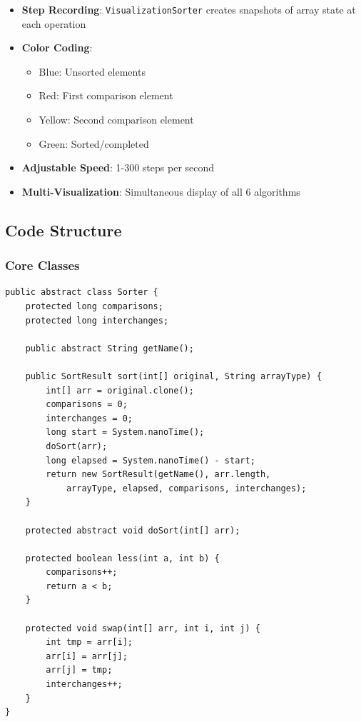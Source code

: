 \documentclass[12pt,a4paper]{article}
\begin{document}
\begin{itemize}
    \item \textbf{Step Recording}: \texttt{VisualizationSorter} creates snapshots of array state at each operation
    \item \textbf{Color Coding}: 
    \begin{itemize}
        \item Blue: Unsorted elements
        \item Red: First comparison element
        \item Yellow: Second comparison element
        \item Green: Sorted/completed
    \end{itemize}
    \item \textbf{Adjustable Speed}: 1-300 steps per second
    \item \textbf{Multi-Visualization}: Simultaneous display of all 6 algorithms
\end{itemize}

\subsection{Code Structure}

\subsubsection{Core Classes}

\begin{lstlisting}[caption={Sorter Abstract Base Class}]
public abstract class Sorter {
    protected long comparisons;
    protected long interchanges;
    
    public abstract String getName();
    
    public SortResult sort(int[] original, String arrayType) {
        int[] arr = original.clone();
        comparisons = 0;
        interchanges = 0;
        long start = System.nanoTime();
        doSort(arr);
        long elapsed = System.nanoTime() - start;
        return new SortResult(getName(), arr.length, 
            arrayType, elapsed, comparisons, interchanges);
    }
    
    protected abstract void doSort(int[] arr);
    
    protected boolean less(int a, int b) {
        comparisons++;
        return a < b;
    }
    
    protected void swap(int[] arr, int i, int j) {
        int tmp = arr[i];
        arr[i] = arr[j];
        arr[j] = tmp;
        interchanges++;
    }
}
\end{lstlisting}
\end{document}
